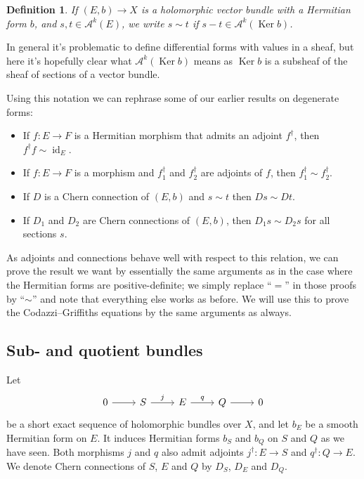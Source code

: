 \documentclass[10pt,a4paper]{article}
\newtheorem{defi}[theo]{Definition}
\newcommand{\cc}[1]{\mathcal{#1}}
\DeclareMathOperator{\Ker}{Ker}
\DeclareMathOperator{\id}{id}
\begin{document}
\begin{defi}
If $(E, b) \to X$ is a holomorphic vector bundle with a Hermitian form $b$, and $s, t \in \cc A^k(E)$, we write
\(
s \sim t
\)
if $s - t \in \cc A^k(\Ker b)$.
\end{defi}

In general it's problematic to define differential forms with values in a sheaf, but here it's hopefully clear what $\cc A^k(\Ker b)$ means as $\Ker b$ is a subsheaf of the sheaf of sections of a vector bundle.

Using this notation we can rephrase some of our earlier results on degenerate forms:
\begin{itemize}
\item
If $f : E \to F$ is a Hermitian morphism that admits an adjoint $f^\dagger$, then $f^\dagger f \sim \id_E$.

\item
If $f : E \to F$ is a morphism and $f_1^\dagger$ and $f_2^\dagger$ are adjoints of $f$, then $f_1^\dagger \sim f_2^\dagger$.

\item
If $D$ is a Chern connection of $(E,b)$ and $s \sim t$ then $Ds \sim Dt$.

\item
If $D_1$ and $D_2$ are Chern connections of $(E,b)$, then $D_1s \sim D_2s$ for all sections $s$.
\end{itemize}
As adjoints and connections behave well with respect to this relation, we can
prove the result we want by essentially the same arguments as in the case where
the Hermitian forms are positive-definite; we simply replace ``$=$'' in those
proofs by ``$\sim$'' and note that everything else works as before. We will use
this to prove the Codazzi--Griffiths equations by the same arguments as always.



\subsection{Sub- and quotient bundles}

Let
\[
\begin{tikzcd}
0 \ar[r] &
S \ar[r,"j"] &
E \ar[r,"q"] &
Q \ar[r] &
0
\end{tikzcd}
\]
be a short exact sequence of holomorphic bundles over $X$, and let $b_E$ be a smooth Hermitian form on $E$. It induces Hermitian forms $b_S$ and $b_Q$ on $S$ and $Q$ as we have seen. Both morphisms $j$ and $q$ also admit adjoints $j^\dagger: E \to S$ and $q^\dagger : Q \to E$. We denote Chern connections of $S$, $E$ and $Q$ by $D_S$, $D_E$ and $D_Q$.
\end{document}
